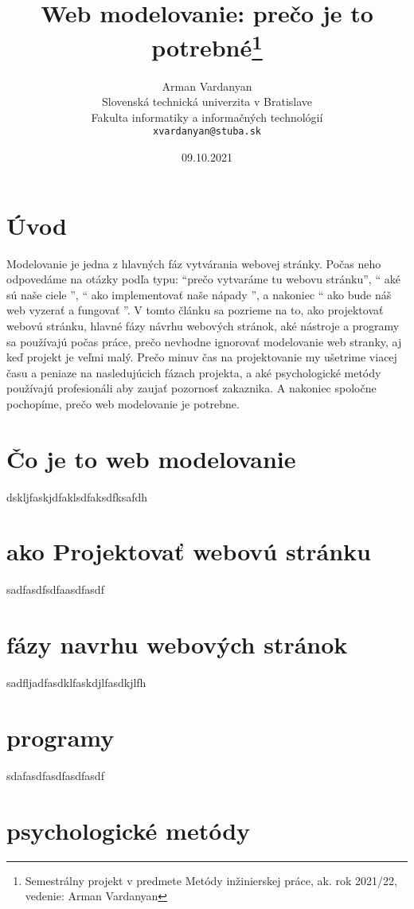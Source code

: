 \documentclass[10pt,twoside,slovak,a4paper]{article}
\title{Web modelovanie: prečo je to potrebné\thanks{Semestrálny projekt v predmete Metódy inžinierskej práce, ak. rok 2021/22, vedenie: Arman Vardanyan}} %
\author{Arman Vardanyan\\[2pt]
	{\small Slovenská technická univerzita v Bratislave}\\
	{\small Fakulta informatiky a informačných technológií}\\
	{\small \texttt{xvardanyan@stuba.sk}}
	}
\date{\small 09.10.2021} %
\begin{document}
\maketitle

\begin{center}
    
\end{center}

\section{Úvod}

Modelovanie je jedna z hlavných fáz vytvárania webovej stránky. Počas neho odpovedáme na otázky podľa typu: “prečo vytvaráme tu webovu stránku”, “ aké sú naše ciele ”, “ ako implementovať naše nápady ”, a nakoniec “ ako bude náš web vyzerať a fungovať ”. V tomto článku sa pozrieme na to, ako projektovať webovú stránku, hlavné fázy návrhu webových stránok, aké nástroje a programy sa používajú počas práce, prečo nevhodne ignorovať modelovanie web stranky, aj keď projekt je veľmi malý. Prečo minuv čas na projektovanie my ušetrime viacej času a peniaze na nasledujúcich fázach projekta, a aké psychologické metódy používajú profesionáli aby zaujať pozornosť zakaznika. A nakoniec spoločne pochopíme, prečo web modelovanie je potrebne.


\section{Čo je to web modelovanie}

dskljfaskjdfaklsdfaksdfksafdh

\section{ako Projektovať webovú stránku}

sadfasdfsdfaasdfasdf

\section{fázy navrhu webových stránok}

sadfljadfasdklfaskdjlfasdkjlfh

\section{programy}

sdafasdfasdfasdfasdf

\section{psychologické metódy}
\end{document}
